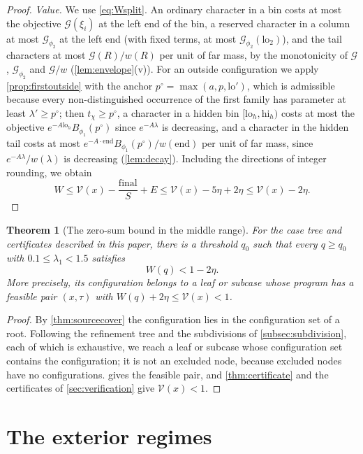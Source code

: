 \documentclass[11pt]{amsart}
\numberwithin{equation}{section}
\theoremstyle{plain}
\newtheorem{theorem}{Theorem}[section]
\theoremstyle{definition}
\theoremstyle{remark}
\newcommand{\lo}{\mathrm{lo}}
\newcommand{\hi}{\mathrm{hi}}
\newcommand{\1}{\mathbf{1}}
\begin{document}
\begin{proof}
\emph{Value.} We use \eqref{eq:Wsplit}. An ordinary character in a bin costs at most the
objective $\mathcal G(\xi_i)$ at the left end of the bin, a reserved character in a column at most $\mathcal G_{\phi_2}$ at
the left end (with fixed terms, at most $\mathcal G_{\phi_2}(\lo_2)$), and the tail characters at most $\mathcal G(R)/w(R)$ per unit of far mass, by the monotonicity
of $\mathcal G$, $\mathcal G_{\phi_2}$ and $\mathcal G/w$ (\cref{lem:envelope}(v)). For an outside configuration we apply
\cref{prop:firstoutside} with the anchor $p^\circ=\max(a,p,\lo')$, which is admissible because every
non-distinguished occurrence of the first family has parameter at least $\lambda'\ge p^\circ$; then
$t_\chi\ge p^\circ$, a character in a hidden bin $[\lo_h,\hi_h)$ costs at most the objective $e^{-A\lo_h}B_{\phi_1}(p^\circ)$
since $e^{-A\lambda}$ is decreasing, and a character in the hidden tail costs at most
$e^{-A\cdot\mathrm{end}}B_{\phi_1}(p^\circ)/w(\mathrm{end})$ per unit of far mass, since $e^{-A\lambda}/w(\lambda)$ is decreasing
(\cref{lem:decay}). Including the directions of integer rounding, we obtain
\[
  W\le\mathcal V(x)-\frac{\mathrm{final}}S+E
    \le\mathcal V(x)-5\eta+2\eta
    \le\mathcal V(x)-2\eta.
\]
\end{proof}

\begin{theorem}[The zero-sum bound in the middle range]\label{thm:cover}
For the case tree and certificates described in this paper, there is a threshold
$q_0$ such that every $q\ge q_0$ with $0.1\le\lambda_1<1.5$ satisfies
\[
  W(q)<1-2\eta.
\]
More precisely, its configuration belongs to a leaf or subcase whose program has a
feasible pair $(x,\tau)$ with $W(q)+2\eta\le\mathcal V(x)<1$.
\end{theorem}

\begin{proof}
By \cref{thm:sourcecover} the configuration lies in the configuration set of a root. Following the
refinement tree and the subdivisions of \cref{subsec:subdivision}, each of which is exhaustive,
we reach a leaf or subcase whose configuration set contains the configuration; it is not an
excluded node, because excluded nodes have no configurations.  gives the
feasible pair, and \cref{thm:certificate} and the certificates of \cref{sec:verification} give
$\mathcal V(x)<1$.
\end{proof}

\section{The exterior regimes}\label{sec:exteriors}
\end{document}

